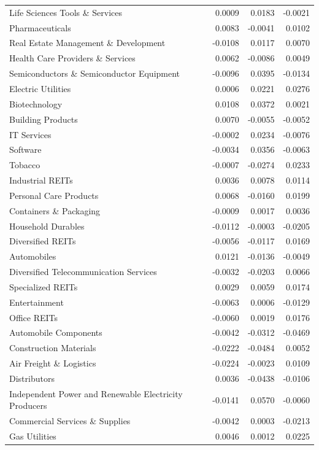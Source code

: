 \begin{table}
\begin{tabular}{lrrr}
Life Sciences Tools \& Services & 0.0009 & 0.0183 & -0.0021 \\
Pharmaceuticals & 0.0083 & -0.0041 & 0.0102 \\
Real Estate Management \& Development & -0.0108 & 0.0117 & 0.0070 \\
Health Care Providers \& Services & 0.0062 & -0.0086 & 0.0049 \\
Semiconductors \& Semiconductor Equipment & -0.0096 & 0.0395 & -0.0134 \\
Electric Utilities & 0.0006 & 0.0221 & 0.0276 \\
Biotechnology & 0.0108 & 0.0372 & 0.0021 \\
Building Products & 0.0070 & -0.0055 & -0.0052 \\
IT Services & -0.0002 & 0.0234 & -0.0076 \\
Software & -0.0034 & 0.0356 & -0.0063 \\
Tobacco & -0.0007 & -0.0274 & 0.0233 \\
Industrial REITs & 0.0036 & 0.0078 & 0.0114 \\
Personal Care Products & 0.0068 & -0.0160 & 0.0199 \\
Containers \& Packaging & -0.0009 & 0.0017 & 0.0036 \\
Household Durables & -0.0112 & -0.0003 & -0.0205 \\
Diversified REITs & -0.0056 & -0.0117 & 0.0169 \\
Automobiles & 0.0121 & -0.0136 & -0.0049 \\
Diversified Telecommunication Services & -0.0032 & -0.0203 & 0.0066 \\
Specialized REITs & 0.0029 & 0.0059 & 0.0174 \\
Entertainment & -0.0063 & 0.0006 & -0.0129 \\
Office REITs & -0.0060 & 0.0019 & 0.0176 \\
Automobile Components & -0.0042 & -0.0312 & -0.0469 \\
Construction Materials & -0.0222 & -0.0484 & 0.0052 \\
Air Freight \& Logistics & -0.0224 & -0.0023 & 0.0109 \\
Distributors & 0.0036 & -0.0438 & -0.0106 \\
Independent Power and Renewable Electricity Producers & -0.0141 & 0.0570 & -0.0060 \\
Commercial Services \& Supplies & -0.0042 & 0.0003 & -0.0213 \\
Gas Utilities & 0.0046 & 0.0012 & 0.0225 \\

\end{tabular}
\end{table}
